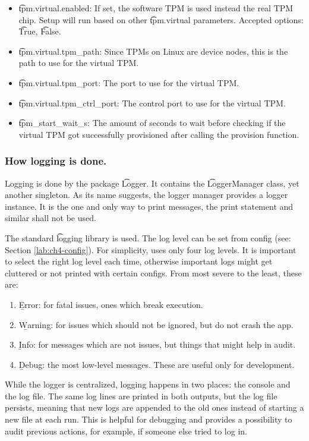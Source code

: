 \begin{itemize}
    Must be in sync with \t{tpm.virtual.fapi\_profile}.
  \item \t{tpm.virtual.enabled}:
    If set, the software TPM is used instead the real TPM chip.
    Setup will run based on other \t{tpm.virtual} parameters.
    Accepted options: \t{True}, \t{False}.
  \item \t{tpm.virtual.tpm\_path}:
    Since TPMs on Linux are device nodes, this is the path to use for the virtual TPM.
  \item \t{tpm.virtual.tpm\_port}:
    The port to use for the virtual TPM.
  \item \t{tpm.virtual.tpm\_ctrl\_port}:
    The control port to use for the virtual TPM.
  \item \t{tpm\_start\_wait\_s}:
    The amount of seconds to wait before checking if the virtual TPM got successfully provisioned after calling the provision function.
\end{itemize}


\subsubsection{How logging is done.}

Logging is done by the package \t{Logger}.
It contains the \t{LoggerManager} class, yet another singleton.
As its name suggests, the logger manager provides a logger instance.
It is the one and only way to print messages, the print statement and similar shall not be used.

The standard \t{logging} library is used.
The log level can be set from config (see: Section \ref{lab:ch4-config}).
For simplicity, \app{} uses only four log levels.
It is important to select the right log level each time, otherwise important logs might get cluttered or not printed with certain configs.
From most severe to the least, these are:
\begin{enumerate}
    \item \b{Error}: for fatal issues, ones which break execution.
    \item \b{Warning}: for issues which should not be ignored, but do not crash the app.
    \item \b{Info}: for messages which are not issues, but things that might help in audit.
    \item \b{Debug}: the most low-level messages. These are useful only for development.
\end{enumerate}

While the logger is centralized, logging happens in two places: the console and the log file.
The same log lines are printed in both outputs, but the log file persists, meaning that new logs are appended to the old ones instead of starting a new file at each run.
This is helpful for debugging and provides a possibility to audit previous actions, for example, if someone else tried to log in.

